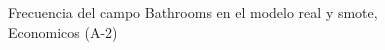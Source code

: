 \begin{figure}[H]
    \centering
    
    \caption{Frecuencia del campo Bathrooms en el modelo real y smote, Economicos (A-2)}
    \label{frecuency-Bathrooms-smote-enc}
\end{figure}